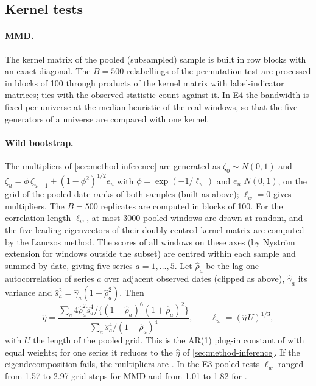 \subsection{Kernel tests}\label{app:impl-kernel}

\paragraph{MMD.}
The kernel matrix of the pooled (subsampled) sample is built in row blocks with an exact
diagonal. The $B=500$ relabellings of the permutation test are processed in blocks of 100
through products of the kernel matrix with label-indicator matrices; ties with the observed
statistic count against it. In E4 the bandwidth
is fixed per universe at the median heuristic of the real \TEST{} windows, so that the five
generators of a universe are compared with one kernel.

\paragraph{Wild bootstrap.}
The multipliers of \cref{sec:method-inference} are generated as $\zeta_0\sim N(0,1)$ and
$\zeta_u=\phi\,\zeta_{u-1}+(1-\phi^2)^{1/2}e_u$ with $\phi=\exp(-1/\ell_w)$ and $e_u$ \iid{}
$N(0,1)$, on the grid of the pooled date ranks of both samples (built as above); $\ell_w=0$
gives \iid{} multipliers. The $B=500$ replicates are computed in blocks of 100. For the
correlation length $\ell_w$, at most 3000 pooled windows are drawn at random, and the five
leading eigenvectors of their doubly centred kernel matrix are computed by the Lanczos method.
The scores of all windows on these axes (by Nystr\"om extension for windows outside the subset)
are centred within each sample and summed by date, giving five series $a=1,\dots,5$. Let
$\hat\rho_a$ be the lag-one autocorrelation of series $a$ over adjacent observed dates (clipped
as above), $\hat\gamma_a$ its variance and $\hat s_a^2=\hat\gamma_a(1-\hat\rho_a^2)$. Then
\begin{equation*}
  \hat\eta=\frac{\sum_a4\hat\rho_a^2\hat s_a^4/\{(1-\hat\rho_a)^6(1+\hat\rho_a)^2\}}
                {\sum_a\hat s_a^4/(1-\hat\rho_a)^4},\qquad \ell_w=(\hat\eta\,U)^{1/3},
\end{equation*}
with $U$ the length of the pooled grid. This is the AR(1) plug-in constant of
\citet{andrews1991heteroskedasticity} with equal weights; for one series it reduces to the
$\hat\eta$ of \cref{sec:method-inference}. If the eigendecomposition fails, the multipliers are
\iid{}. In the E3 pooled tests $\ell_w$ ranged from 1.57 to 2.97 grid steps for MMD and from 1.01
to 1.82 for \SigMMD{}.

